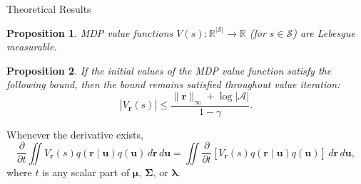 \documentclass[handout,8pt]{beamer}
\newtheorem{proposition}{Proposition}
\newcommand{\rinf}{\lVert \mathbf{r} \rVert_\infty}
\newcommand{\vbound}{\frac{\rinf + \log|\mathcal{A}|}{1 - \gamma}}
\newcommand{\dt}{\frac{\partial}{\partial t}}
\newcommand{\dx}{\,d\mathbf{r}\,d\mathbf{u}}
\begin{document}
\begin{frame}{Theoretical Results}
  \begin{proposition}
    MDP value functions $V(s) : \mathbb{R}^{|\mathcal{S}|} \to \mathbb{R}$ (for
    $s \in \mathcal{S}$) are Lebesgue measurable.
  \end{proposition}
  \begin{proposition}
    If the initial values of the MDP value function satisfy the following
    bound, then the bound remains satisfied throughout value iteration:
    \[
      |V_{\mathbf{r}}(s)| \le \vbound.
    \]
  \end{proposition}
  \begin{theorem} \label{thm:main}
    Whenever the derivative exists,
    \[
      \dt\iint
      V_{\mathbf{r}}(s)q(\mathbf{r} \mid \mathbf{u})q(\mathbf{u})\dx
      = \iint
      \dt[V_{\mathbf{r}}(s)q(\mathbf{r} \mid \mathbf{u})q(\mathbf{u})]\dx,
    \]
    where $t$ is any scalar part of $\bm\mu$, $\bm\Sigma$, or $\bm\lambda$.
  \end{theorem}
\end{frame}
\end{document}
